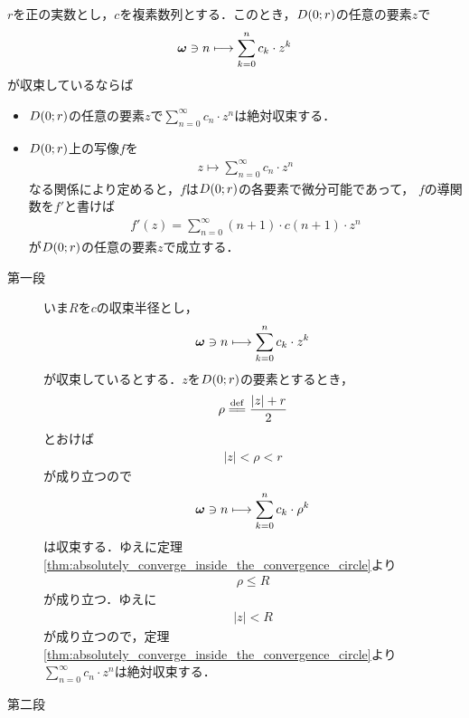 	\begin{screen}
		\begin{thm}[級数で表される関数は微分可能]
		\label{thm:series_expanded_then_differentiable}
			$r$を正の実数とし，$c$を複素数列とする．このとき，$D(0;r)$の任意の要素$z$で
			\begin{align}
				{\boldsymbol \omega} \ni n \longmapsto \sum_{k=0}^{n} c_{k} \cdot z^{k}
			\end{align}
			が収束しているならば
			\begin{itemize}
				\item $D(0;r)$の任意の要素$z$で$\sum_{n=0}^{\infty} c_{n} \cdot z^{n}$は絶対収束する．
				\item $D(0;r)$上の写像$f$を
					\begin{align}
						z \longmapsto \sum_{n=0}^{\infty} c_{n} \cdot z^{n}
					\end{align}
					なる関係により定めると，$f$は$D(0;r)$の各要素で微分可能であって，
					$f$の導関数を$f'$と書けば
					\begin{align}
						f'(z) = \sum_{n=0}^{\infty} (n+1) \cdot c(n+1) \cdot z^{n}
					\end{align}
					が$D(0;r)$の任意の要素$z$で成立する．
			\end{itemize}
		\end{thm}
	\end{screen}
	
	\begin{sketch}\mbox{}
		\begin{description}
			\item[第一段]
				いま$R$を$c$の収束半径とし，
				\begin{align}
					{\boldsymbol \omega} \ni n \longmapsto \sum_{k=0}^{n} c_{k} \cdot z^{k}
				\end{align}
				が収束しているとする．$z$を$D(0;r)$の要素とするとき，
				\begin{align}
					\rho \defeq \frac{|z| + r}{2}
				\end{align}
				とおけば
				\begin{align}
					|z| < \rho < r
				\end{align}
				が成り立つので
				\begin{align}
					{\boldsymbol \omega} \ni n \longmapsto \sum_{k=0}^{n} c_{k} \cdot \rho^{k}
				\end{align}
				は収束する．ゆえに定理\ref{thm:absolutely_converge_inside_the_convergence_circle}より
				\begin{align}
					\rho \leq R
				\end{align}
				が成り立つ．ゆえに
				\begin{align}
					|z| < R
				\end{align}
				が成り立つので，定理\ref{thm:absolutely_converge_inside_the_convergence_circle}より
				$\sum_{n=0}^{\infty} c_{n} \cdot z^{n}$は絶対収束する．
			
			\item[第二段]
				\QED
		\end{description}
	\end{sketch}
	
